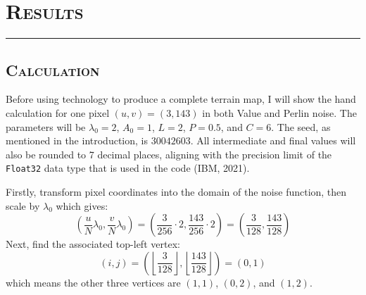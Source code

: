 \section{\textsc{Results}}
\hrule height 0.5pt
\vspace*{2.5pt}

\subsection{\textsc{Calculation}}
\vspace*{-10pt}

Before using technology to produce a complete terrain map, I will show the hand calculation for one pixel $(u,v)=(3,143)$ in both Value 
and Perlin noise. The parameters will be $\lambda_0=2$, $A_0=1$, $L=2$, $P=0.5$, and $C=6$. The seed, as mentioned in the introduction, 
is $30042603$. All intermediate and final values will also be rounded to 7 decimal places, aligning with the precision limit of the 
\texttt{Float32} data type that is used in the code (IBM, 2021).

Firstly, transform pixel coordinates into the domain of the noise function, then scale by $\lambda_0$ which gives:
\[\left(\frac{u}{N}\lambda_0,\frac{v}{N}\lambda_0\right)=\left(\frac{3}{256}\cdot2,\frac{143}{256}\cdot2\right)=\left(\frac{3}{128},\frac{143}{128}\right)\]
Next, find the associated top-left vertex:
\[(i,j)=\left(\left\lfloor\frac{3}{128}\right\rfloor,\left\lfloor\frac{143}{128}\right\rfloor\right)=(0,1)\]
which means the other three vertices are $(1,1)$, $(0,2)$, and $(1,2)$.

